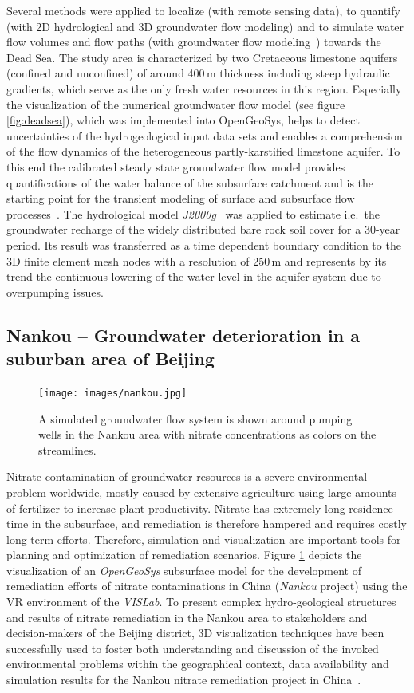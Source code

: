 \documentclass[twocolumn]{svjour3}          %
\begin{document}
Several methods were applied to localize (with remote sensing data), to quantify (with 2D hydrological and 3D groundwater flow modeling) and to simulate water flow volumes and flow paths (with groundwater flow modeling~\cite{graebe:modelcare}) towards the Dead Sea. The study area is characterized by two Cretaceous limestone aquifers (confined and unconfined) of around 400\,m thickness including steep hydraulic gradients, which serve as the only fresh water resources in this region. Especially the visualization of the numerical groundwater flow model (see figure \ref{fig:deadsea}), which was implemented into OpenGeoSys, helps to detect uncertainties of the hydrogeological input data sets and enables a comprehension of the flow dynamics of the heterogeneous partly-karstified limestone aquifer. To this end the calibrated steady state groundwater flow model provides quantifications of the water balance of the subsurface catchment and is the starting point for the transient modeling of surface and subsurface flow processes~\cite{graebe:wessti}. The hydrological model \emph{J2000g}~\cite{KrauseKralisch:2005, Krause:2001} was applied to estimate i.e.~the groundwater recharge of the widely distributed bare rock soil cover for a 30-year period. Its result was transferred as a time dependent boundary condition to the 3D finite element mesh nodes with a resolution of 250\,m and represents by its trend the continuous lowering of the water level in the aquifer system due to overpumping issues.

\subsection{Nankou -- Groundwater deterioration in a suburban area of Beijing}
\label{nankou}

\begin{figure}[htb]
  \texttt{[image: images/nankou.jpg]}
\caption{A simulated groundwater flow system is shown around pumping wells in the Nankou area with nitrate concentrations as colors on the streamlines.}
\label{fig:nankou}
\end{figure}

Nitrate contamination of groundwater resources is a severe environmental problem worldwide, mostly caused by extensive agriculture using large amounts of fertilizer to increase plant productivity. Nitrate has extremely long residence time in the subsurface, and remediation is therefore hampered and requires costly long-term efforts. Therefore, simulation and visualization are important tools for planning and optimization of remediation scenarios. Figure \ref{fig:nankou} depicts the visualization of an \emph{OpenGeoSys} subsurface model for the development of remediation efforts of nitrate contaminations in China (\emph{Nankou} project) using the VR environment of the \emph{VISLab}. To present complex hydro-geological structures and results of nitrate remediation in the Nankou area to stakeholders and decision-makers of the Beijing district, 3D visualization techniques have been successfully used to foster both understanding and discussion of the invoked environmental problems within the geographical context, data availability and simulation results for the Nankou nitrate remediation project in China~\cite{sun:ees}.
\end{document}
